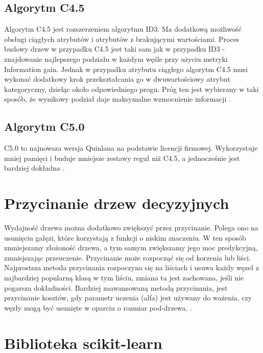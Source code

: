 \documentclass[10pt,a4paper]{article}
\begin{document}
\subsection{Algorytm C4.5}
Algorytm C4.5 jest rozszerzeniem algorytmu ID3. Ma dodatkową możliwość obsługi ciągłych atrybutów i atrybutów z brakującymi wartościami. Proces budowy drzew w przypadku C4.5 jest taki sam jak w przypadku ID3 - znajdowanie najlepszego podziału w każdym węźle przy użyciu metryki Information gain. Jednak w przypadku atrybutu ciągłego algorytm C4.5 musi wykonać dodatkowy krok przekształcania go w dwuwartościowy atrybut kategoryczny, dzieląc około odpowiedniego progu. Próg ten jest wybierany w taki sposób, że wynikowy podział daje maksymalne wzmocnienie informacji \cite{MazumdarWWW, Quinlan1993}.

\subsection{Algorytm C5.0}
C5.0 to najnowsza wersja Quinlana na podstawie licencji firmowej. Wykorzystuje mniej pamięci i buduje mniejsze zestawy reguł niż C4.5, a jednocześnie jest bardziej dokładna \cite{scikit}.

\section{Przycinanie drzew decyzyjnych}
Wydajność drzewa można dodatkowo zwiększyć przez przycinanie. Polega ono na usunięciu gałęzi, które korzystają z funkcji o niskim znaczeniu. W ten sposób zmniejszamy złożoność drzewa, a tym samym zwiększamy jego moc predykcyjną, zmniejszając przeuczenie. Przycinanie może rozpocząć się od korzenia lub liści. Najprostsza metoda przycinania rozpoczyna się na liściach i usuwa każdy węzeł z najbardziej popularną klasą w tym liściu, zmiana ta jest zachowana, jeśli nie pogarsza dokładności. Bardziej zaawansowaną metodą przycinania, jest przycinanie kosztów, gdy parametr uczenia (alfa) jest używany do ważenia, czy węzły mogą być usunięte w oparciu o rozmiar pod-drzewa. \cite{Breiman1984, Lan2017}.


\section{Biblioteka scikit-learn}
\end{document}
